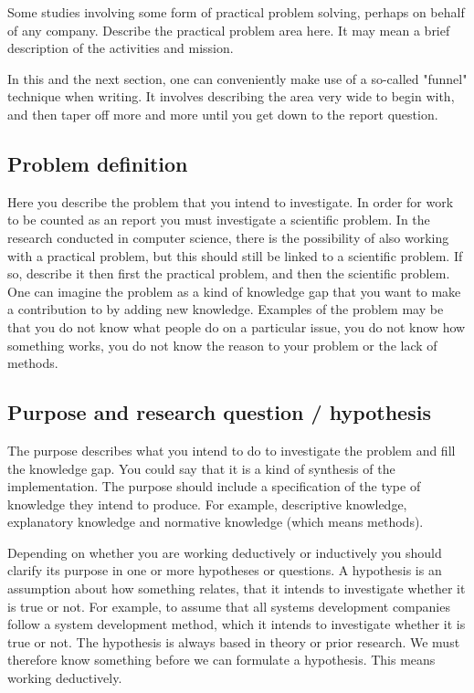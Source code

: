 Some studies involving some form of practical problem solving, perhaps on behalf of any company. Describe the practical problem area here. It may mean a brief description of the activities and mission.

In this and the next section, one can conveniently make use of a so-called "funnel" technique when writing. It involves describing the area very wide to begin with, and then taper off more and more until you get down to the report question.

\subsection{Problem definition}
Here you describe the problem that you intend to investigate. In order for work to be counted as an report you must investigate a scientific problem. In the research conducted in computer science, there is the possibility of also working with a practical problem, but this should still be linked to a scientific problem. If so, describe it then first the practical problem, and then the scientific problem. One can imagine the problem as a kind of knowledge gap that you want to make a contribution to by adding new knowledge. Examples of the problem may be that you do not know what people do on a particular issue, you do not know how something works, you do not know the reason to your problem or the lack of methods.

\subsection{Purpose and research question / hypothesis}
The purpose describes what you intend to do to investigate the problem and fill the knowledge gap. You could say that it is a kind of synthesis of the implementation. The purpose should include a specification of the type of knowledge they intend to produce. For example, descriptive knowledge, explanatory knowledge and normative knowledge (which means methods).

Depending on whether you are working deductively or inductively you should clarify its purpose in one or more hypotheses or questions. A hypothesis is an assumption about how something relates, that it intends to investigate whether it is true or not. For example, to assume that all systems development companies follow a system development method, which it intends to investigate whether it is true or not. The hypothesis is always based in theory or prior research. We must therefore know something before we can formulate a hypothesis. This means working deductively.


